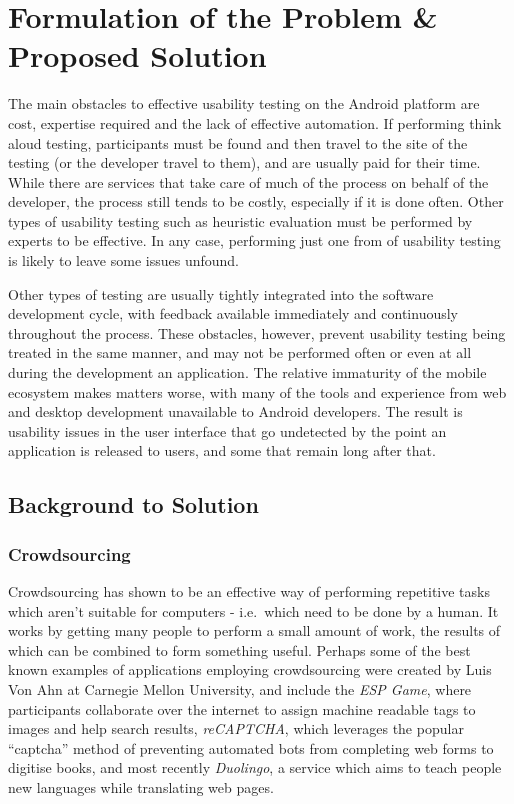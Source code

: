 \chapter{Formulation of the Problem \& Proposed Solution}

The main obstacles to effective usability testing on the Android platform are
cost, expertise required and the lack of effective automation.  If performing
think aloud testing, participants must be found and then travel to the site of
the testing (or the developer travel to them), and are usually paid for their
time. While there are services that take care of much of the process on behalf
of the developer, the process still tends to be costly, especially if it is done
often.  Other types of usability testing such as heuristic evaluation must be
performed by experts to be effective.  In any case,
performing just one from of usability testing is likely to leave some issues
unfound.

Other types of testing are usually tightly integrated into the software development
cycle, with feedback available immediately and continuously throughout the process.
These obstacles, however, prevent usability testing being treated in the same manner,
and may not be performed often or
even at all during the development an application. The relative immaturity of the mobile
ecosystem makes matters worse, with many of the tools and experience from web and
desktop development unavailable to Android developers. The result is usability
issues in the user interface that go undetected by the point an application is
released to users, and some that remain long after that.

\section{Background to Solution}

\subsection{Crowdsourcing}

Crowdsourcing has shown to be an effective way of performing repetitive tasks
which aren't suitable for computers - i.e.\ which need to be done by a human. It
works by getting many people to perform a small amount of work, the results of
which can be combined to form something useful. Perhaps some of the best known
examples of applications employing crowdsourcing were created by Luis Von Ahn
at Carnegie Mellon University, and include the \emph{ESP Game}, where
participants collaborate over the internet to assign machine readable tags to
images and help search results, \emph{reCAPTCHA}, which leverages the popular
``captcha'' method of preventing automated bots from completing web forms to
digitise books, and most recently \emph{Duolingo}, a service which aims to
teach people new languages while translating web pages.

